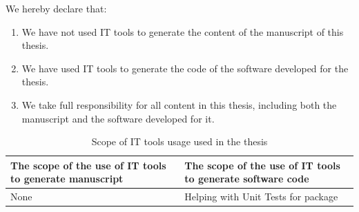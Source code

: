 \documentclass[a4paper,11pt,twoside]{report}
\theoremstyle{definition}
\begin{document}
\normalsize
We hereby declare that:
\begin{enumerate}
    \item We have not used IT tools to generate the content of the manuscript of this thesis.
    \item We have used IT tools to generate the code of the software developed for the thesis.
    \item We take full responsibility for all content in this thesis, including both the manuscript and the software developed for it.
\end{enumerate}

\begin{table}[H]
    \centering
    \label{tab:it_tools_scope}
    \begin{tabularx}{\textwidth}{|X|X|}
    \hline
    \textbf{The scope of the use of IT tools to generate manuscript} & \textbf{The scope of the use of IT tools to generate software code} \\ \hline
    None & Helping with Unit Tests for package \\ \hline
    \end{tabularx}
    \caption{Scope of IT tools usage used in the thesis}
\end{table}




%





\thispagestyle{empty}

\appendix
\end{document}
